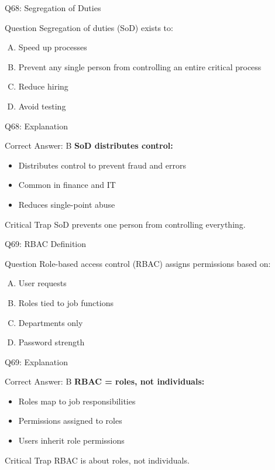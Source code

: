 \documentclass{beamer}
\begin{document}
	\begin{frame}{Q68: Segregation of Duties}
		\begin{block}{Question}
			Segregation of duties (SoD) exists to:
		\end{block}
		\begin{enumerate}[(A)]
			\item Speed up processes
			\item Prevent any single person from controlling an entire critical process
			\item Reduce hiring
			\item Avoid testing
		\end{enumerate}
	\end{frame}
	
	\begin{frame}{Q68: Explanation}
		\begin{block}{Correct Answer: B}
			\textbf{SoD distributes control:}
			\begin{itemize}
				\item Distributes control to prevent fraud and errors
				\item Common in finance and IT
				\item Reduces single-point abuse
			\end{itemize}
		\end{block}
		\begin{alertblock}{Critical Trap}
			SoD prevents one person from controlling everything.
		\end{alertblock}
	\end{frame}
	
	\begin{frame}{Q69: RBAC Definition}
		\begin{block}{Question}
			Role-based access control (RBAC) assigns permissions based on:
		\end{block}
		\begin{enumerate}[(A)]
			\item User requests
			\item Roles tied to job functions
			\item Departments only
			\item Password strength
		\end{enumerate}
	\end{frame}
	
	\begin{frame}{Q69: Explanation}
		\begin{block}{Correct Answer: B}
			\textbf{RBAC = roles, not individuals:}
			\begin{itemize}
				\item Roles map to job responsibilities
				\item Permissions assigned to roles
				\item Users inherit role permissions
			\end{itemize}
		\end{block}
		\begin{alertblock}{Critical Trap}
			RBAC is about roles, not individuals.
		\end{alertblock}
	\end{frame}
	
\end{document}
